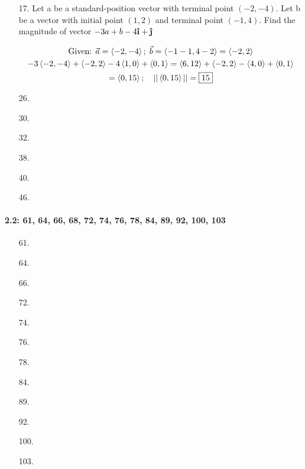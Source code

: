 \documentclass[10pt, letterpaper]{article}
\begin{document}
\begin{itemize}
        \pagebreak

        \item [17.] Let a be a standard-position vector with terminal point $(-2, -4)$. Let b be a vector with initial point $(1, 2)$ and terminal point $(-1, 4)$. Find the magnitude of vector $-3a + b - 4\ihat + \jhat$ \\
        
        \begin{mdframed}
            \begin{equation*}
                \begin{gathered}
                    \text{Given: } \vec{a} = \expval{-2, -4}; \; 
                    \vec{b} = \expval{-1 - 1, 4 - 2} = \expval{-2, 2}                   \\
                    -3\expval{-2, -4} + \expval{-2, 2} - 4\expval{1, 0} + \expval{0, 1}
                    = \expval{6, 12} + \expval{-2, 2} - \expval{4, 0} + \expval{0, 1}   \\
                    = \expval{0, 15}; \quad ||\expval{0, 15}|| = \boxed{15}
                \end{gathered}
            \end{equation*}
        \end{mdframed}

        \item [26.]
        \item [30.]
        \item [32.]
        \item [38.]
        \item [40.]
        \item [46.]
    \end{itemize}

    \paragraph*{2.2: 61, 64, 66, 68, 72, 74, 76, 78, 84, 89, 92, 100, 103}
    
    \begin{itemize}
        \item [61.]
        \item [64.]
        \item [66.]
        \item [72.]
        \item [74.]
        \item [76.]
        \item [78.]
        \item [84.]
        \item [89.]
        \item [92.]
        \item [100.]
        \item [103.]
    \end{itemize}
\end{document}
